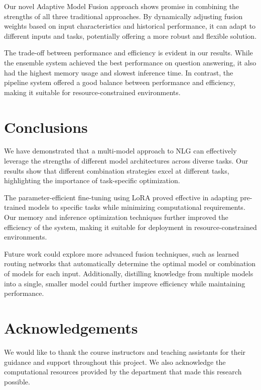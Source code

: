 \documentclass[10pt,twocolumn,letterpaper]{article}
\begin{document}
Our novel Adaptive Model Fusion approach shows promise in combining the strengths of all three traditional approaches. By dynamically adjusting fusion weights based on input characteristics and historical performance, it can adapt to different inputs and tasks, potentially offering a more robust and flexible solution.

The trade-off between performance and efficiency is evident in our results. While the ensemble system achieved the best performance on question answering, it also had the highest memory usage and slowest inference time. In contrast, the pipeline system offered a good balance between performance and efficiency, making it suitable for resource-constrained environments.

\section*{Conclusions}

We have demonstrated that a multi-model approach to NLG can effectively leverage the strengths of different model architectures across diverse tasks. Our results show that different combination strategies excel at different tasks, highlighting the importance of task-specific optimization.

The parameter-efficient fine-tuning using LoRA proved effective in adapting pre-trained models to specific tasks while minimizing computational requirements. Our memory and inference optimization techniques further improved the efficiency of the system, making it suitable for deployment in resource-constrained environments.

Future work could explore more advanced fusion techniques, such as learned routing networks that automatically determine the optimal model or combination of models for each input. Additionally, distilling knowledge from multiple models into a single, smaller model could further improve efficiency while maintaining performance.

\section*{Acknowledgements}

We would like to thank the course instructors and teaching assistants for their guidance and support throughout this project. We also acknowledge the computational resources provided by the department that made this research possible.
\end{document}
